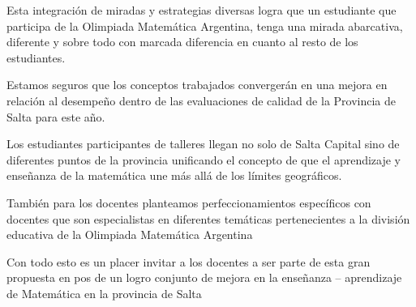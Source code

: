 \documentclass[
]{article}
\begin{document}
Esta integración de miradas y estrategias diversas logra que un
estudiante que participa de la Olimpiada Matemática Argentina, tenga una
mirada abarcativa, diferente y sobre todo con marcada diferencia en
cuanto al resto de los estudiantes.

Estamos seguros que los conceptos trabajados convergerán en una mejora
en relación al desempeño dentro de las evaluaciones de calidad de la
Provincia de Salta para este año.

Los estudiantes participantes de talleres llegan no solo de Salta
Capital sino de diferentes puntos de la provincia unificando el concepto
de que el aprendizaje y enseñanza de la matemática une más allá de los
límites geográficos.

También para los docentes planteamos perfeccionamientos específicos con
docentes que son especialistas en diferentes temáticas pertenecientes a
la división educativa de la Olimpiada Matemática Argentina

Con todo esto es un placer invitar a los docentes a ser parte de esta
gran propuesta en pos de un logro conjunto de mejora en la enseñanza --
aprendizaje de Matemática en la provincia de Salta
\end{document}
